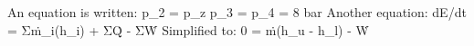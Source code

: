 An equation is written:  
p_2 = p_z  
p_3 = p_4 = 8 bar  
Another equation:  
dE/dt = Σṁ_i(h_i) + ΣQ̇ - ΣẆ  
Simplified to:  
0 = ṁ(h_u - h_l) - Ẇ